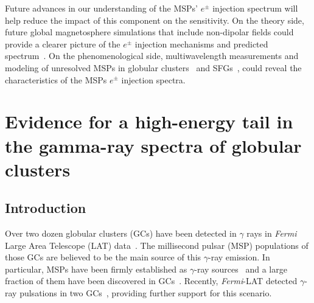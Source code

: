 \documentclass[doublespace,nopageskip]{VTthesis} %
\begin{document}
Future advances in our understanding of the MSPs' $e^\pm$ injection spectrum will help reduce the impact of this component on the sensitivity. On the theory side, future global magnetosphere simulations that include non-dipolar fields could provide a clearer picture of the $e^\pm$ injection mechanisms and predicted spectrum~\citep{Harding:2021yuv}. On the phenomenological side, multiwavelength measurements and modeling of unresolved MSPs in globular clusters~\citep{Ndiyavala:2017hoh, Song:2021zrs} and SFGs~\citep{Sudoh:2020hyu}, could reveal the characteristics of the MSPs $e^\pm$ injection spectra. 

\chapter{Evidence for a high-energy tail in the gamma-ray spectra of globular clusters} \label{ch:globular_cluster}



\section{Introduction}\label{sec:intro}

Over two dozen globular clusters (GCs) have been detected in $\gamma$ rays in {\it Fermi} Large Area Telescope (LAT) data~\citep{2009Sci...325..845A,2010A&A...524A..75A,2010ApJ...712L..36K,2011ApJ...729...90T,2015MNRAS.448.3215Z,2016MNRAS.459...99Z}. The millisecond pulsar (MSP) populations of those GCs are believed to be the main source of this $\gamma$-ray emission. In particular, MSPs have been firmly established as $\gamma$-ray sources~\citep{1996A&A...311L...9V,2009ApJ...699.1171A,2013MNRAS.430..571E,2013ApJS..208...17A} and a large fraction of them have been discovered in GCs~\citep{2005ASPC..328..147C}. Recently, \textit{Fermi}-LAT detected $\gamma$-ray pulsations in two GCs~\citep{2011Sci...334.1107F,2013ApJ...778..106J}, providing further support for this scenario.
\end{document}
